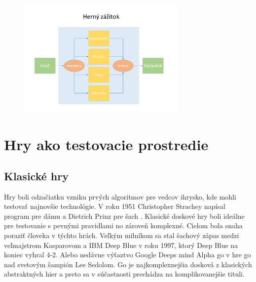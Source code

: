 \documentclass{article}
\begin{document}
\begin{figure}[ht]
\centering
\includegraphics[width=83mm]{HernÃ½ zÃ¡Å¾itok diagram.pdf}
\end{figure}

\clearpage

\section{Hry ako testovacie prostredie}
\subsection{Klasické hry}

Hry boli odzačiatku vzniku prvých algoritmov pre vedcov ihrysko, kde mohli testovať najnovšie technológie. V roku 1951 Christopher Strachey  napísal program pre dámu a Dietrich Prinz pre šach \cite{Copeland}. Klasické doskové hry boli ideálne pre testovanie s pevnými pravidlami no zároveň komplexné. Cielom bola snaha poraziť človeka v týchto hrách. Veľkým milníkom sa stal šachový zápas medzi veľmajstrom Kasparovom a IBM Deep Blue v roku 1997, ktorý Deep Blue na koniec vyhral 4-2. Alebo nedávne výťaztvo Google Deeps mind Alpha go v hre go nad svetovým šampión Lee Sedolom\cite{Reuters}. Go je najkomplexnejšia dosková z klasických abstraktných hier a preto sa v súčastnosti prechádza na komplikovanejšie tituli.

\begin{table}[ht]
\caption {2. Úspechy umelej inteligencie proti ľuďom} \label{tab:title} 
\end{table}
\end{document}
